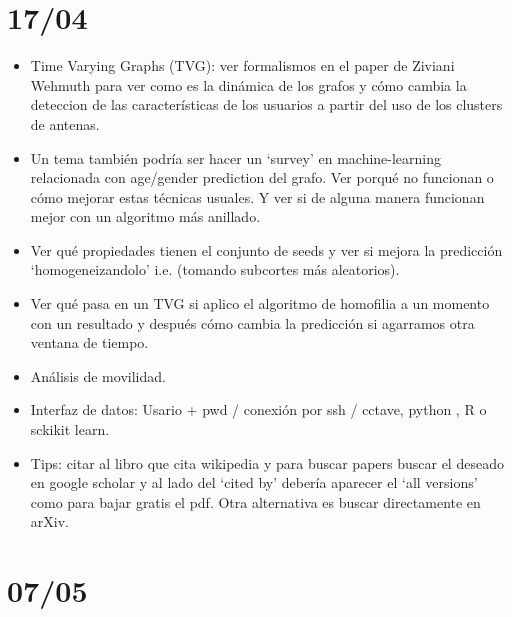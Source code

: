 \documentclass[12pt,a4paper,twocolumn]{report}
\begin{document}
\section*{17/04}
\begin{itemize}
  \item Time Varying Graphs (TVG): ver formalismos en el paper de Ziviani Wehmuth para ver como es la din\'amica de los grafos y c\'omo cambia la deteccion de las caracter\'isticas de los usuarios a partir del uso de los clusters de antenas.

  \item Un tema tambi\'en podr\'ia ser hacer un ‘survey’ en machine-learning relacionada con age/gender prediction del grafo. Ver porqu\'e no funcionan o c\'omo mejorar estas t\'ecnicas usuales. Y ver si de alguna manera funcionan mejor con un algoritmo m\'as anillado.
  \item Ver qu\'e propiedades tienen el conjunto de seeds y ver si mejora la predicci\'on ‘homogeneizandolo’ i.e. (tomando subcortes m\'as aleatorios).
   \item Ver qu\'e pasa en un TVG si aplico el algoritmo de homofilia a un momento con un resultado y despu\'es c\'omo cambia la predicci\'on si agarramos otra ventana de tiempo.
  \item An\'alisis de movilidad.
   \item Interfaz de datos: Usario + pwd / conexi\'on por ssh / cctave, python , R o sckikit learn.
  \item Tips: citar al libro que cita wikipedia y para buscar papers buscar el deseado en google scholar y al lado del ‘cited by’ deber\'ia aparecer el ‘all versions’ como para bajar gratis el pdf. Otra alternativa es buscar directamente en arXiv.
\end{itemize}

\section*{07/05}
\end{document}
